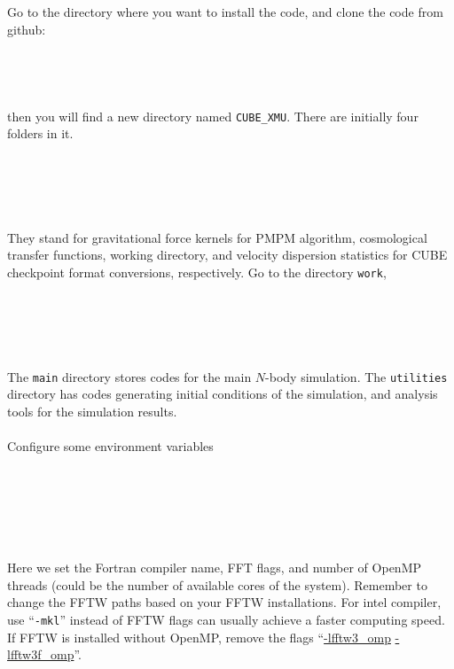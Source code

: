 \documentclass[12pt]{article}
\begin{document}
Go to the directory where you want to install the code, and clone the code from github:
\\\\
 \\
 \\
\\
then you will find a new directory named {\tt CUBE\_XMU}. There are initially four folders in it.
\\\\
 \\
 \\
 \\
\\
They stand for gravitational force kernels for PMPM algorithm, cosmological transfer functions, working directory, and velocity dispersion statistics for CUBE checkpoint format conversions, respectively. Go to the directory {\tt work},
\\\\
 \\
 \\
 \\
\\
The {\tt main} directory stores codes for the main $N$-body simulation. The {\tt utilities} directory has codes generating initial conditions of the simulation, and analysis tools for the simulation results.
\\\\
Configure some environment variables
\\\\
\\
\\
\\
\\\\
Here we set the Fortran compiler name, FFT flags, and number of OpenMP threads (could be the number of available cores of the system). Remember to change the FFTW paths based on your FFTW installations. For intel compiler, use ``{\tt -mkl}'' instead of FFTW flags can usually achieve a faster computing speed. If FFTW is installed without OpenMP, remove the flags ``\url{-lfftw3_omp} \url{-lfftw3f_omp}''.
\end{document}
